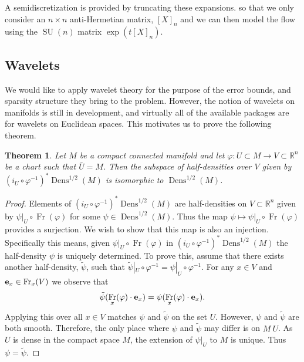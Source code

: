 \documentclass[12pt]{amsart}
\renewcommand{\phi}{\varphi}
\newtheorem{thm}{Theorem}
\DeclareMathOperator{\SU}{SU}
\DeclareMathOperator{\Fr}{Fr}
\DeclareMathOperator{\Dens}{Dens}
\begin{document}
A semidiscretization is provided by truncating these expansions.
so that we only consider an $n \times n$ anti-Hermetian matrix, $[X]_n$
and we can then model the flow using the $\SU(n)$ matrix $\exp( t [X]_n)$.

\subsection{Wavelets}
\label{sec:wavelets}
We would like to apply wavelet theory for the purpose of the error bounds,
and sparsity structure they bring to the problem.
However, the notion of wavelets on manifolds is still in development,
and virtually all of the available packages are for wavelets on Euclidean spaces.
This motivates us to prove the following theorem.

\begin{thm} \label{thm:global_chart}
  Let $M$ be a compact connected manifold and let
  $\phi:U \subset M \to V \subset \mathbb{R}^n$
  be a chart such that $\bar{U} = M$.
  Then the subspace of half-densities over $V$ given by
  $(i_U \circ \phi^{-1})^* \Dens^{1/2}(M)$ is isomorphic
  to $\Dens^{1/2}(M)$.
\end{thm}
\begin{proof}
  Elements of $(i_U \circ \phi^{-1})^* \Dens^{1/2}(M)$
  are half-densities on $V \subset \mathbb{R}^n$ given by $ \left. \psi \right|_{U} \circ \Fr(\phi)$ for some $\psi \in \Dens^{1/2}(M)$.
  Thus the map $\psi \mapsto \psi|_U \circ \Fr(\phi)$ provides a surjection.
  We wish to show that this map is also an injection.
  Specifically this means, given $\left. \psi \right|_{U} \circ \Fr(\phi)$ in $(i_U \circ \phi^{-1})^*\Dens^{1/2}(M)$ the half-density $\psi$ is uniquely determined.
  To prove this, assume that there exists another half-density,
  $\tilde{\psi}$, such that $\tilde{\psi}|_U \circ \phi^{-1} = \psi|_U \circ \phi^{-1}$.
  For any $x \in V$ and ${\bf e}_x \in \Fr_x(V)$ we observe that
  \begin{align*}
    \tilde{\psi}( \Fr_x(\varphi) \cdot {\bf e}_x) = \psi( \Fr_x( \varphi) \cdot {\bf e}_x).
  \end{align*}
  Applying this over all $x \in V$ matches $\psi$ and $\tilde{\psi}$ on the set $U$.
  However, $\psi$ and $\tilde{\psi}$ are both smooth.
  Therefore, the only place where $\psi$ and $\tilde{\psi}$ may differ is on $M \ U$.
  As $U$ is dense in the compact space $M$,
  the extension of $\psi|_U$ to $M$ is unique.
  Thus $\psi = \tilde{\psi}$.
\end{proof}
\end{document}
